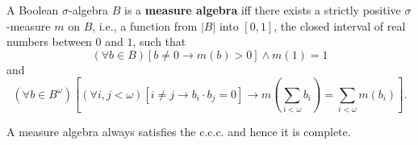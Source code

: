 A Boolean $\sigma$-algebra $B$ is a \textbf{measure algebra} iff there exists a strictly positive $\sigma$-measure $m$ on $B$, i.e., a function from $|B|$ into $[0, 1]$, the closed interval of real numbers between $0$ and $1$, such that
$$
(\forall b \in B) [b \neq 0 \rightarrow m(b) > 0] \wedge m(1) = 1
$$
and
$$
(\forall b \in B^{\omega}) \left[ (\forall i, j < \omega) [i \neq j \rightarrow b_i \cdot b_j = 0] \rightarrow m\left( \sum_{i < \omega} b_i \right) = \sum_{i < \omega} m(b_i) \right].
$$

\begin{remark}
A measure algebra always satisfies the c.c.c. and hence it is complete.
\end{remark}

